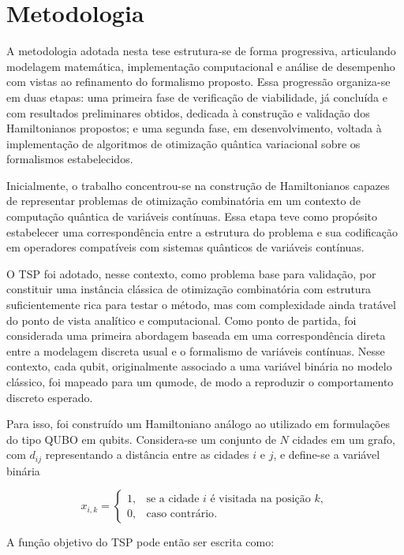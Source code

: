 \chapter{Metodologia} \label{cap:proposta}

    A metodologia adotada nesta tese estrutura-se de forma progressiva, articulando modelagem matemática, implementação computacional e análise de desempenho com vistas ao refinamento do formalismo proposto. Essa progressão organiza-se em duas etapas: uma primeira fase de verificação de viabilidade, já concluída e com resultados preliminares obtidos, dedicada à construção e validação dos Hamiltonianos propostos; e uma segunda fase, em desenvolvimento, voltada à implementação de algoritmos de otimização quântica variacional sobre os formalismos estabelecidos.

    Inicialmente, o trabalho concentrou-se na construção de Hamiltonianos capazes de representar problemas de otimização combinatória em um contexto de computação quântica de variáveis contínuas. Essa etapa teve como propósito estabelecer uma correspondência entre a estrutura do problema e sua codificação em operadores compatíveis com sistemas quânticos de variáveis contínuas.

    O TSP foi adotado, nesse contexto, como problema base para validação, por constituir uma instância clássica de otimização combinatória com estrutura suficientemente rica para testar o método, mas com complexidade ainda tratável do ponto de vista analítico e computacional. Como ponto de partida, foi considerada uma primeira abordagem baseada em uma correspondência direta entre a modelagem discreta usual e o formalismo de variáveis contínuas. Nesse contexto, cada qubit, originalmente associado a uma variável binária no modelo clássico, foi mapeado para um qumode, de modo a reproduzir o comportamento discreto esperado.

    Para isso, foi construído um Hamiltoniano análogo ao utilizado em formulações do tipo QUBO em qubits. Considera-se um conjunto de $N$ cidades em um grafo, com $d_{ij}$ representando a distância entre as cidades $i$ e $j$, e define-se a variável binária

    $$
    x_{i,k} =
    \begin{cases}
    1, & \text{se a cidade $i$ é visitada na posição $k$},\\
    0, & \text{caso contrário}.
    \end{cases}
    $$

    A função objetivo do TSP pode então ser escrita como:

